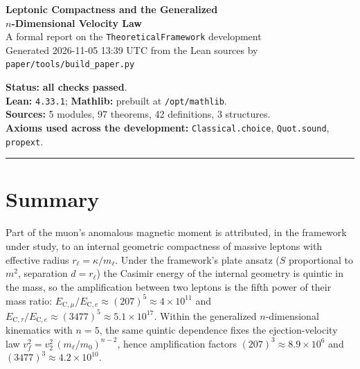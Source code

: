 \documentclass[11pt,a4paper]{article}
\title{}
\date{}
\begin{document}
\sloppy

\begin{center}
{\LARGE\bfseries Leptonic Compactness and the Generalized\\[2pt]
$n$-Dimensional Velocity Law}\\[6pt]
{\large A formal report on the \texttt{TheoreticalFramework} development}\\[10pt]
{\small Generated 2026-11-05 13:39 UTC from the Lean sources by \texttt{paper/tools/build\_paper.py}}
\end{center}

\vspace{4pt}
\begin{center}
\begin{minipage}{0.92\textwidth}
\small
\textbf{Status:} \textbf{\textcolor{okgreen}{all checks passed}}.\\
\textbf{Lean:} \texttt{4.33.1}; \textbf{Mathlib:} prebuilt at \texttt{/opt/mathlib}.\\
\textbf{Sources:} 5 modules, 97 theorems, 42 definitions,
3 structures.\\
\textbf{Axioms used across the development:} \texttt{Classical.choice}, \texttt{Quot.sound}, \texttt{propext}.
\end{minipage}
\end{center}

\vspace{6pt}
\noindent\rule{\textwidth}{0.4pt}
\section*{Summary}

Part of the muon's anomalous magnetic moment is attributed, in the framework
under study, to an internal geometric compactness of massive leptons with
effective radius $r_\ell = \kappa/m_\ell$.  Under the framework's plate ansatz
($S$ proportional to $m^2$, separation $d = r_\ell$) the Casimir energy of the
internal geometry is quintic in the mass, so the amplification between two
leptons is the fifth power of their mass ratio:
$E_{\mathrm{C},\mu}/E_{\mathrm{C},e} \approx (207)^5 \approx 4\times10^{11}$
and $E_{\mathrm{C},\tau}/E_{\mathrm{C},e} \approx (3477)^5 \approx 5.1\times10^{17}$.
Within the generalized $n$-dimensional kinematics with $n = 5$, the same quintic
dependence fixes the ejection-velocity law
$v_f^2 = v_2^2\,(m_\ell/m_0)^{n-2}$, hence amplification factors
$(207)^3 \approx 8.9\times10^{6}$ and $(3477)^3 \approx 4.2\times10^{10}$.
\end{document}
